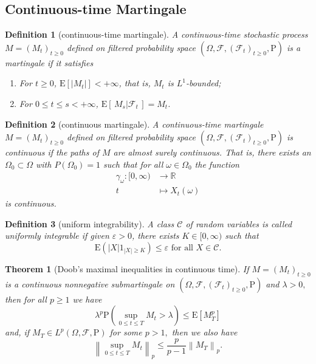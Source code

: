 \documentclass{article}
\newtheorem{definition}{Definition}[section]
\newtheorem{theorem}{Theorem}[section]
\theoremstyle{nonumberplain}
\begin{document}
\subsection{Continuous-time Martingale}
\begin{definition}[continuous-time martingale]
	A continuous-time stochastic process $M=(M_t)_{t\ge 0}$ defined on filtered probability space $(\Omega,\mathcal{F},(\mathcal{F}_{t})_{t\ge0},\mathrm{P})$ is a \emph{martingale} if it satisfies
	\begin{enumerate}
		\item For $t\ge0$, $\mathrm{E}[|M_t|]<+\infty$, that is, $M_t$ is $L^1$-bounded;
		\item For $0\le t\le s<+\infty$, $\mathrm{E}[\,M_{s}|\mathcal{F}_t\,]=M_t$.
	\end{enumerate}
\end{definition}
\begin{definition}[continuous martingale]
	A continuous-time martingale $M=(M_t)_{t\ge 0}$ defined on filtered probability space $(\Omega,\mathcal{F},(\mathcal{F}_{t})_{t\ge0},\mathrm{P})$ is continuous if the paths of $M$ are almost surely continuous. That is, there exists an $\Omega_{0} \subset \Omega$ with $P\left(\Omega_{0}\right)=1$ such that for all $\omega \in \Omega_{0}$ the function
	\begin{align*}
	\gamma_\omega:[0, \infty)&\longrightarrow\mathbb{R}\\
	t&\longmapsto X_{t}(\omega)
	\end{align*}
	is continuous.
\end{definition}

\begin{definition}[uniform integrability]
	A class $\mathcal {C}$ of random variables is called \emph{uniformly integrable} if given $\varepsilon >0$, there exists $K\in [0,\infty )$ such that 
	\[
	\mathrm{E}\left(|X| 1_{|X| \geq K}\right) \leq \varepsilon \text { for all } X \in \mathcal{C}.
	\]	
\end{definition}

\begin{theorem}[Doob's maximal inequalities in continuous time]
If $M=(M_{t})_{t\ge0}$ is a continuous nonnegative submartingale on $(\Omega,\mathcal{F},(\mathcal{F}_{t})_{t\ge0},\mathrm{P})$ and $\lambda>0,$ then for all $p \geq 1$ we have
\[
\lambda^{p} \mathrm{P}\left(\sup_{0 \le t \le T} M_{t}>\lambda\right) \le \mathrm{E}\left[M_{T}^{p}\right]
\]
and, if $M_{T} \in L^{p}(\Omega,\mathcal{F},\mathrm{P})$ for some $p>1,$ then we also have
\[
\left\|\sup_{0 \leq t \leq T} M_{t}\right\|_{p} \leq \frac{p}{p-1}\left\|M_{T}\right\|_{p}.
\]
\end{theorem}
\end{document}
